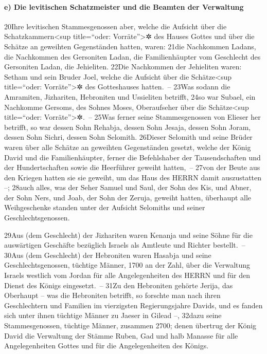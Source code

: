 \hypertarget{e-die-levitischen-schatzmeister-und-die-beamten-der-verwaltung}{%
\paragraph{e) Die levitischen Schatzmeister und die Beamten der
Verwaltung}\label{e-die-levitischen-schatzmeister-und-die-beamten-der-verwaltung}}

20Ihre levitischen Stammesgenossen aber, welche die Aufsicht über die
Schatzkammern\textless sup title=``oder: Vorräte''\textgreater✲ des
Hauses Gottes und über die Schätze an geweihten Gegenständen hatten,
waren: 21die Nachkommen Ladans, die Nachkommen des Gersoniten Ladan, die
Familienhäupter vom Geschlecht des Gersoniten Ladan, die Jehieliten.
22Die Nachkommen der Jehieliten waren: Setham und sein Bruder Joel,
welche die Aufsicht über die Schätze\textless sup title=``oder:
Vorräte''\textgreater✲ des Gotteshauses hatten.~-- 23Was sodann die
Amramiten, Jizhariten, Hebroniten und Ussieliten betrifft, 24so war
Subael, ein Nachkomme Gersoms, des Sohnes Moses, Oberaufseher über die
Schätze\textless sup title=``oder: Vorräte''\textgreater✲.~-- 25Was
ferner seine Stammesgenossen von Elieser her betrifft, so war dessen
Sohn Rehabja, dessen Sohn Jesaja, dessen Sohn Joram, dessen Sohn Sichri,
dessen Sohn Selomith. 26Dieser Selomith und seine Brüder waren über alle
Schätze an geweihten Gegenständen gesetzt, welche der König David und
die Familienhäupter, ferner die Befehlshaber der Tausendschaften und der
Hundertschaften sowie die Heerführer geweiht hatten,~-- 27von der Beute
aus den Kriegen hatten sie sie geweiht, um das Haus des HERRN damit
auszustatten --; 28auch alles, was der Seher Samuel und Saul, der Sohn
des Kis, und Abner, der Sohn Ners, und Joab, der Sohn der Zeruja,
geweiht hatten, überhaupt alle Weihgeschenke standen unter der Aufsicht
Selomiths und seiner Geschlechtsgenossen.

29Aus (dem Geschlecht) der Jizhariten waren Kenanja und seine Söhne für
die auswärtigen Geschäfte bezüglich Israels als Amtleute und Richter
bestellt.~-- 30Aus (dem Geschlecht) der Hebroniten waren Hasabja und
seine Geschlechtsgenossen, tüchtige Männer, 1700 an der Zahl, über die
Verwaltung Israels westlich vom Jordan für alle Angelegenheiten des
HERRN und für den Dienst des Königs eingesetzt.~-- 31Zu den Hebroniten
gehörte Jerija, das Oberhaupt -- was die Hebroniten betrifft, so
forschte man nach ihren Geschlechtern und Familien im vierzigsten
Regierungsjahre Davids, und es fanden sich unter ihnen tüchtige Männer
zu Jaeser in Gilead --, 32dazu seine Stammesgenossen, tüchtige Männer,
zusammen 2700; denen übertrug der König David die Verwaltung der Stämme
Ruben, Gad und halb Manasse für alle Angelegenheiten Gottes und für die
Angelegenheiten des Königs.

